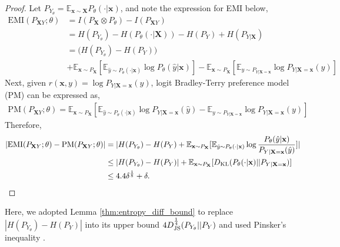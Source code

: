 \begin{proof} 
Let $P_{Y_{\theta}}=\mathbb{E}_{\mathbf{x}\sim \mathbf{X}}P_{\theta}(\cdot|\mathbf{x})$, and note the expression for EMI below,
    \begin{align*}
    \text{EMI}(P_{\mathbf{X}Y};\theta) &= I(P_{\mathbf{X}} \otimes P_{\theta}) - I(P_{\mathbf{X}Y}) \nonumber\\
    &= H(P_{Y_{\theta}}) - H(P_{\theta}(\cdot|\mathbf{X})) - H(P_Y) + H(P_{Y|\mathbf{X}}) \nonumber\\
    &= \big ( H(P_{Y_{\theta}}) - H(P_Y) \big ) \nonumber\\
    &+ \mathbb{E}_{\mathbf{x}\sim P_{\mathbf{X}}}[\mathbb{E}_{\hat{y}\sim P_{\theta}(\cdot|\mathbf{x})}\log P_{\theta}(\hat{y}|\mathbf{x})] - \mathbb{E}_{\mathbf{x}\sim P_{\mathbf{X}}}[\mathbb{E}_{y\sim P_{Y|\mathbf{X}=\mathbf{x}}}\log P_{Y|\mathbf{X}=\mathbf{x}}(y)] \nonumber
    \end{align*}
Next, given $r(\mathbf{x},y)=\log P_{Y|\mathbf{X}=\mathbf{x}}(y)$, logit Bradley-Terry preference model (PM) \cite{hunter2004mm} can be expressed as,
    \begin{align*}
    \text{PM}(P_{\mathbf{X}Y};\theta) = \mathbb{E}_{\mathbf{x}\sim P_{\mathbf{X}}}[\mathbb{E}_{\hat{y}\sim P_{\theta}(\cdot|\mathbf{x})}\log P_{Y|\mathbf{X}=\mathbf{x}}(\hat{y}) - \mathbb{E}_{y\sim P_{Y|\mathbf{X}=\mathbf{x}}}\log P_{Y|\mathbf{X}=\mathbf{x}}(y) ]
    \end{align*}
Therefore, 
\begin{align*}
    | \text{EMI}(P_{\mathbf{X}Y};\theta) - \text{PM}(P_{\mathbf{X}Y};\theta) | &=  |H(P_{Y_{\theta}}) - H(P_Y) + \mathbb{E}_{\mathbf{x}\sim P_{\mathbf{X}}}[\mathbb{E}_{\hat{y}\sim P_{\theta}(\cdot|\mathbf{x})}\log \frac{P_{\theta}(\hat{y}|\mathbf{x})}{P_{Y|\mathbf{X}=\mathbf{x}}(\hat{y})}]| \\
    & \leq |H(P_{Y_{\theta}}) - H(P_Y)| + \mathbb{E}_{\mathbf{x}\sim P_{\mathbf{X}}}[D_{\rm KL}(P_{\theta}(\cdot|\mathbf{x})||P_{Y|\mathbf{X}=\mathbf{x}})] \\
    & \leq 4.4\delta^{\frac{1}{8}} + \delta.
\end{align*}
\end{proof}
Here, we adopted Lemma \ref{thm:entropy_diff_bound} to replace $|H(P_{Y_{\theta}})-H(P_{Y})|$ into its upper bound $4 D^{\frac{1}{4}}_{\rm JS}(P_{Y_{\theta}}||P_Y)$ and used Pinsker's inequality \cite{pinsker1964information}.

